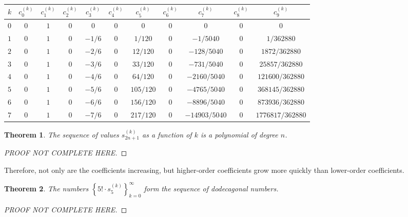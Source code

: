 \documentclass{article}
\newtheorem{theorem}{Theorem}
\begin{document}
    \begin{table}[h]
    \centering
    \begin{tabular}{@{}l|cccccccccc@{}}
    $k$ & $c_{0}^{(k)}$ & $c_{1}^{(k)}$ & $c_{2}^{(k)}$ & $c_{3}^{(k)}$ & $c_{4}^{(k)}$ & $c_{5}^{(k)}$ & $c_{6}^{(k)}$ & $c_{7}^{(k)}$ & $c_{8}^{(k)}$ & $c_{9}^{(k)}$ \\ \midrule
    $0$ & $0$ & $1$ & $0$ & $0$    & $0$ & $0$       & $0$ & $0$           & $0$ & $0$              \\
    $1$ & $0$ & $1$ & $0$ & $-1/6$ & $0$ & $1/120$   & $0$ & $-1/5040$     & $0$ & $1/362880$       \\
    $2$ & $0$ & $1$ & $0$ & $-2/6$ & $0$ & $12/120$  & $0$ & $-128/5040$   & $0$ & $1872/362880$    \\
    $3$ & $0$ & $1$ & $0$ & $-3/6$ & $0$ & $33/120$  & $0$ & $-731/5040$   & $0$ & $25857/362880$   \\
    $4$ & $0$ & $1$ & $0$ & $-4/6$ & $0$ & $64/120$  & $0$ & $-2160/5040$  & $0$ & $121600/362880$  \\
    $5$ & $0$ & $1$ & $0$ & $-5/6$ & $0$ & $105/120$ & $0$ & $-4765/5040$  & $0$ & $368145/362880$  \\
    $6$ & $0$ & $1$ & $0$ & $-6/6$ & $0$ & $156/120$ & $0$ & $-8896/5040$  & $0$ & $873936/362880$  \\
    $7$ & $0$ & $1$ & $0$ & $-7/6$ & $0$ & $217/120$ & $0$ & $-14903/5040$ & $0$ & $1776817/362880$ \\
    \end{tabular}
    \end{table}

    \begin{theorem}
        The sequence of values $s_{2n+1}^{(k)}$ as a function of $k$ is a polynomial of degree $n$.
    \end{theorem}
    \begin{proof}
        [PROOF NOT COMPLETE HERE]
    \end{proof}

    Therefore, not only are the coefficients increasing, but higher-order coefficients grow more quickly than lower-order coefficients.

    \begin{theorem}
        The numbers $\left\{5! \cdot s_{5}^{(k)}\right\}_{k=0}^{\infty}$ form the sequence of dodecagonal numbers.
    \end{theorem}
    \begin{proof}
        [PROOF NOT COMPLETE HERE]
    \end{proof}
\end{document}
